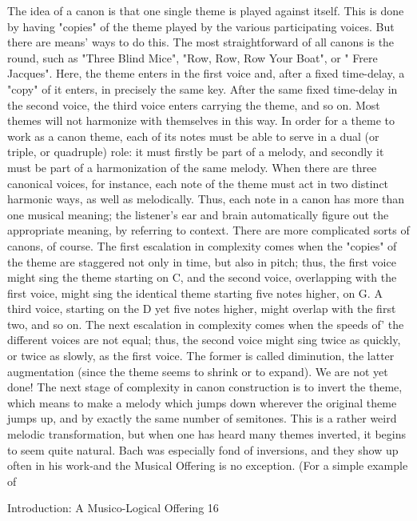 The idea of a canon is that one single theme is played against itself. This is done by
having "copies" of the theme played by the various participating voices. But there are
means' ways to do this. The most straightforward of all canons is the round, such as
"Three Blind Mice", "Row, Row, Row Your Boat", or " Frere Jacques". Here, the theme
enters in the first voice and, after a fixed time-delay, a "copy" of it enters, in precisely the
same key. After the same fixed time-delay in the second voice, the third voice enters
carrying the theme, and so on. Most themes will not harmonize with themselves in this
way. In order for a theme to work as a canon theme, each of its notes must be able to
serve in a dual (or triple, or quadruple) role: it must firstly be part of a melody, and
secondly it must be part of a harmonization of the same melody. When there are three
canonical voices, for instance, each note of the theme must act in two distinct harmonic
ways, as well as melodically. Thus, each note in a canon has more than one musical
meaning; the listener's ear and brain automatically figure out the appropriate meaning, by
referring to context.
  There are more complicated sorts of canons, of course. The first escalation in
complexity comes when the "copies" of the theme are staggered not only in time, but also
in pitch; thus, the first voice might sing the theme starting on C, and the second voice,
overlapping with the first voice, might sing the identical theme starting five notes higher,
on G. A third voice, starting on the D yet five notes higher, might overlap with the first
two, and so on. The next escalation in complexity comes when the speeds of' the different
voices are not equal; thus, the second voice might sing twice as quickly, or twice as
slowly, as the first voice. The former is called diminution, the latter augmentation (since
the theme seems to shrink or to expand).
  We are not yet done! The next stage of complexity in canon construction is to invert the
theme, which means to make a melody which jumps down wherever the original theme
jumps up, and by exactly the same number of semitones. This is a rather weird melodic
transformation, but when one has heard many themes inverted, it begins to seem quite
natural. Bach was especially fond of inversions, and they show up often in his work-and
the Musical Offering is no exception. (For a simple example of




Introduction: A Musico-Logical Offering                                                      16


